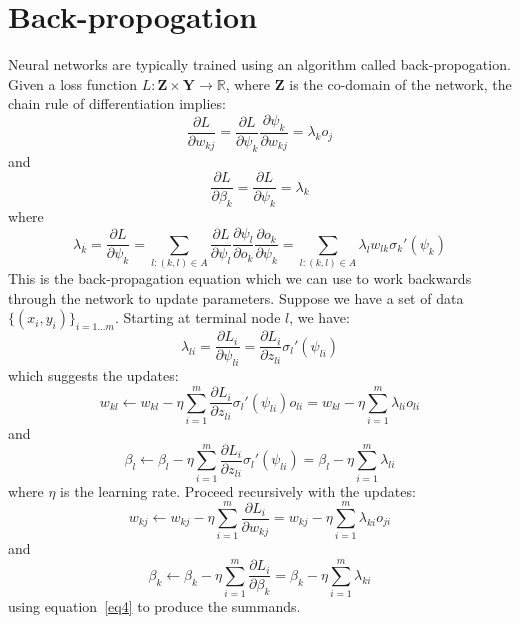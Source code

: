 \documentclass[11pt]{article}
\begin{document}
\section{Back-propogation}
Neural networks are typically trained using an algorithm called back-propogation. Given a loss function $L: \mathbf{Z} \times \mathbf{Y} \rightarrow \mathbb{R}$, where $\mathbf{Z}$ is the co-domain of the network, the chain rule of differentiation implies:
\begin{equation} \label{eq2}
\frac{\partial L}{\partial w_{kj}} = \frac{\partial L}{\partial \psi _{k}} \frac{\partial \psi _{k}}{\partial w_{kj}} = \lambda _{k} o_{j}
\end{equation}
and
\begin{equation} \label{eq3}
\frac{\partial L}{\partial \beta_k} = \frac{\partial L}{\partial \psi_{k}} = \lambda_{k}
\end{equation}
where
\begin{equation} \label{eq4}
\lambda _{k} = \frac{\partial L}{\partial \psi _{k}} = \sum_{l : \left( k , l \right) \in A}\frac{\partial L}{\partial \psi _{l}} \frac{\partial \psi _{l}}{\partial o_{k}} \frac{\partial o_{k}}{\partial \psi _{k}} = \sum_{l : \left( k , l \right) \in A} \lambda _{l} w_{lk} \sigma_{k}' \left( \psi _{k} \right)
\end{equation}
This is the back-propagation equation which we can use to work backwards through the network to update parameters. Suppose we have a set of data $\{ \left(x_i ,y_i \right) \}_{i=1...m}$. Starting at terminal node $l$, we have:
\begin{equation}
\lambda_{li} = \frac{\partial L_i}{\partial \psi_{li}} = \frac{\partial L_i}{\partial z_{li}} \sigma_l' \left( \psi_{li} \right)
\end{equation}
which suggests the updates:
\begin{equation}
w_{kl} \leftarrow w_{kl} - \eta \sum_{i=1}^m \frac{\partial L_i}{\partial z_{li}} \sigma_l' \left( \psi_{li} \right) o_{li}
= w_{kl} - \eta \sum_{i=1}^m \lambda_{li} o_{li}
\end{equation}
and
\begin{equation}
\beta_l \leftarrow \beta_l - \eta \sum_{i=1}^m \frac{\partial L_i}{\partial z_{li}} \sigma_l' \left( \psi_{li} \right)
= \beta_l - \eta \sum_{i=1}^m \lambda_{li}
\end{equation}
where $\eta$ is the learning rate.
Proceed recursively with the updates:
\begin{equation} \label{eq8}
w_{kj} \leftarrow w_{kj} - \eta \sum_{i=1}^m \frac{\partial L_i}{\partial w_{kj}}
= w_{kj} - \eta \sum_{i=1}^m \lambda_{ki} o_{ji}
\end{equation}
and
\begin{equation} \label{eq9}
\beta_k \leftarrow \beta_k - \eta \sum_{i=1}^m \frac{\partial L_i}{\partial \beta_k}
= \beta_k - \eta \sum_{i=1}^m \lambda_{ki}
\end{equation}
using equation~\eqref{eq4} to produce the summands.
\end{document}
